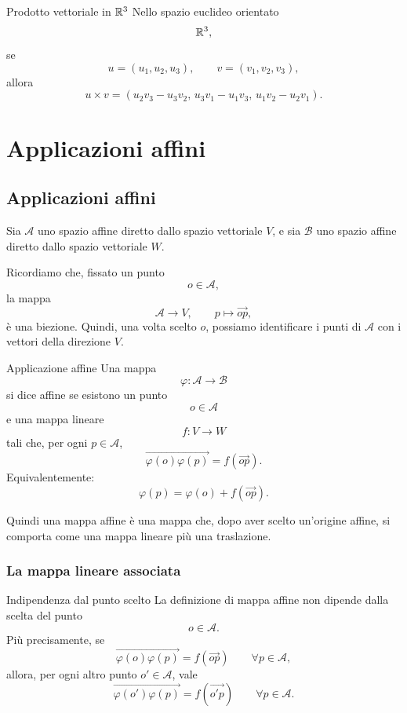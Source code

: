 \documentclass[a4paper]{article}
\begin{document}
\begin{snippetcorollary}{Prodotto vettoriale in \(\mathbb{R}^3\)}
    Nello spazio euclideo orientato
    \[
        \mathbb{R}^3,
    \]
    se
    \[
        u=(u_1,u_2,u_3),
        \qquad
        v=(v_1,v_2,v_3),
    \]
    allora
    \[
        u\times v
        =
        (u_2v_3-u_3v_2,\,
            u_3v_1-u_1v_3,\,
        u_1v_2-u_2v_1).
    \]
\end{snippetcorollary}

\section{Applicazioni affini}

\subsection{Applicazioni affini}

Sia \(\mathcal{A}\) uno spazio affine diretto dallo spazio vettoriale \(V\), e sia \(\mathcal{B}\) uno spazio affine diretto dallo spazio vettoriale \(W\).

Ricordiamo che, fissato un punto
\[
    o\in\mathcal{A},
\]
la mappa
\[
    \mathcal{A}\to V,
    \qquad
    p\mapsto \overrightarrow{op},
\]
è una biezione. Quindi, una volta scelto \(o\), possiamo identificare i punti di \(\mathcal{A}\) con i vettori della direzione \(V\).

\begin{snippetdefinition}{Applicazione affine}
    Una mappa
    \[
        \varphi:\mathcal{A}\to\mathcal{B}
    \]
    si dice affine se esistono un punto
    \[
        o\in\mathcal{A}
    \]
    e una mappa lineare
    \[
        f:V\to W
    \]
    tali che, per ogni \(p\in\mathcal{A}\),
    \[
        \overrightarrow{\varphi(o)\varphi(p)}
        =
        f(\overrightarrow{op}).
    \]
    Equivalentemente:
    \[
        \varphi(p)=\varphi(o)+f(\overrightarrow{op}).
    \]
\end{snippetdefinition}

Quindi una mappa affine è una mappa che, dopo aver scelto un'origine affine, si comporta come una mappa lineare più una traslazione.

\subsubsection{La mappa lineare associata}

\begin{snippetproposition}{Indipendenza dal punto scelto}
    La definizione di mappa affine non dipende dalla scelta del punto
    \[
        o\in\mathcal{A}.
    \]
    Più precisamente, se
    \[
        \overrightarrow{\varphi(o)\varphi(p)}
        =
        f(\overrightarrow{op})
        \qquad
        \forall p\in\mathcal{A},
    \]
    allora, per ogni altro punto \(o'\in\mathcal{A}\), vale
    \[
        \overrightarrow{\varphi(o')\varphi(p)}
        =
        f(\overrightarrow{o'p})
        \qquad
        \forall p\in\mathcal{A}.
    \]
\end{snippetproposition}
\end{document}
